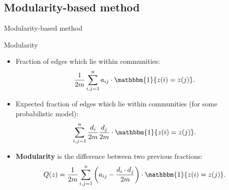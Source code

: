 \documentclass{beamer}
\theoremstyle{definition}
\theoremstyle{plain}
\theoremstyle{remark}
\begin{document}
		\subsection{Modularity-based method}
			\begin{frame}{Modularity-based method}
				\vspace{-5pt}
				\begin{block}{Modularity}
					\begin{itemize}
						\item Fraction of edges which lie within communities:
								\begin{equation}
									\begin{aligned}
										\frac{1}{2m} \sum\limits_{i,j=1}^{n} a_{ij} \cdot \mathbbm{1}\{ z(i) = z(j) \}.
										\nonumber
									\end{aligned}
								\end{equation}
						\item Expected fraction of edges which lie within communities (for some probabilistic model):
								\begin{equation}
									\begin{aligned}
										\sum\limits_{i,j=1}^{n}\frac{d_i}{2m}\frac{d_j}{2m} \cdot \mathbbm{1}\{ z(i) = z(j) \}.
										\nonumber
									\end{aligned}
								\end{equation}
						\item \textbf{Modularity} is the difference between two previous fractions:
								\begin{equation}
									\begin{aligned}
										Q(z) = 
										\frac{1}{2m} \sum\limits_{i,j=1}^{n} \left(a_{ij} - \frac{d_i\cdot d_j}{2m}\right) \cdot \mathbbm{1}\{ z(i) = z(j) \}.
										\nonumber
									\end{aligned}
								\end{equation}
					\end{itemize}
				\end{block}
			\end{frame}
\end{document}
